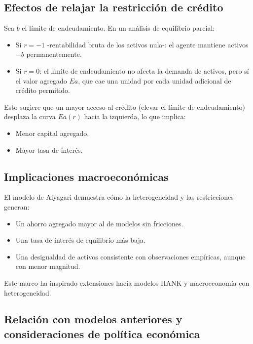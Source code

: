 \documentclass[a4paper,12pt]{article}
\begin{document}
\subsection*{Efectos de relajar la restricción de crédito}

Sea \( b \) el límite de endeudamiento. En un análisis de equilibrio parcial:

\begin{itemize}
	\item Si \( r = -1 \) -rentabilidad bruta de los activos nula-: el agente mantiene activos \( -b \) permanentemente.
	\item Si \( r = 0 \): el límite de endeudamiento no afecta la demanda de activos, pero sí el valor agregado \( E a \), que cae una unidad por cada unidad adicional de crédito permitido.
\end{itemize}

Esto sugiere que un mayor acceso al crédito (elevar el límite de endeudamiento) desplaza la curva \( E a(r) \) hacia la izquierda, lo que implica:

\begin{itemize}
	\item Menor capital agregado.
	\item Mayor tasa de interés.
\end{itemize}




\subsection{Implicaciones macroeconómicas}

El modelo de Aiyagari demuestra cómo la heterogeneidad y las restricciones generan:
\begin{itemize}
	\item Un ahorro agregado mayor al de modelos sin fricciones.
	\item Una tasa de interés de equilibrio más baja.
	\item Una desigualdad de activos consistente con observaciones empíricas, aunque con menor magnitud.
\end{itemize}
Este marco ha inspirado extensiones hacia modelos HANK y macroeconomía con heterogeneidad.

\subsection{Relación con modelos anteriores y consideraciones de política económica}
\end{document}
